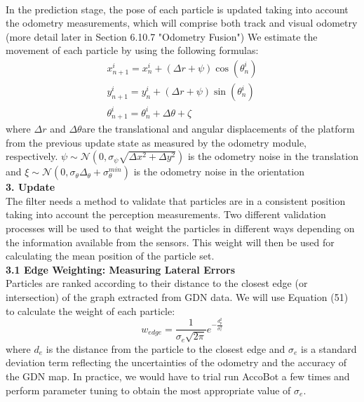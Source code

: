 \documentclass[11pt]{article}		%
\begin{document}
	    \\In the prediction stage, the pose of each particle is updated taking into account the odometry measurements, which will comprise both track and visual odometry (more detail later in Section 6.10.7 "Odometry Fusion") We estimate the movement of each particle by using the following formulas:
	    \begin{equation}
\begin{array}{l}
x_{n+1}^{i}=x_{n}^{i}+(\Delta r+\psi) \cos \left(\theta_{n}^{i}\right) \\
y_{n+1}^{i}=y_{n}^{i}+(\Delta r+\psi) \sin \left(\theta_{n}^{i}\right) \\
\theta_{n+1}^{i}=\theta_{n}^{i}+\Delta \theta+\zeta
\end{array}
\end{equation}
    where $\Delta r$ and $\Delta \theta$are the translational and angular displacements of the platform from the previous
    update state as measured by the odometry module, respectively. $\psi \sim \mathcal{N}\left(0, \sigma_{\psi} \sqrt{\Delta x^{2}+\Delta y^{2}}\right)$ is the odometry noise in the translation and $\xi \sim \mathcal{N}\left(0, \sigma_{\theta} \Delta_{\theta}+\sigma_{\theta}^{m i n}\right)$ is the odometry noise in the orientation
	\\\textbf{3. Update}
	\\The filter needs a method to validate that particles are in a consistent position taking into account the perception measurements. Two different validation processes will be used to that weight the particles in different ways depending on the information available from the sensors.
    This weight will then be used for calculating the mean position of the particle set.
    \\\textbf{3.1 Edge Weighting: Measuring Lateral Errors}
    \\Particles are ranked according to their distance to the closest edge (or intersection) of the graph extracted from GDN data. We will use Equation (51) to calculate the weight of each particle:
    \begin{equation}
w_{e d g e}=\frac{1}{\sigma_{e} \sqrt{2 \pi}} e^{-\frac{d_{p}^{2}}{\sigma_{e}^{2}}}
\end{equation}
    where $d_e$ is the distance from the particle to the closest edge and $\sigma_e$ is a standard deviation term reflecting the uncertainties of the odometry and the accuracy of the GDN map. In practice, we would have to trial run AccoBot a few times and perform parameter tuning to obtain the most appropriate value of $\sigma_e$.
    
\end{document}
